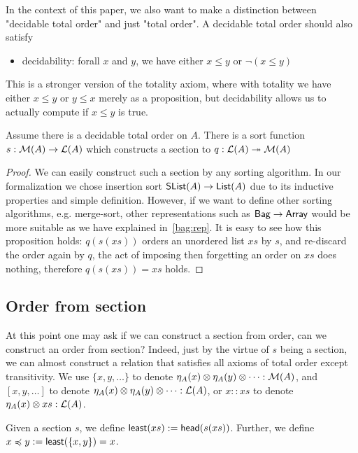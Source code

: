 In the context of this paper, we also want to make a distinction between "decidable total order"
and just "total order". A decidable total order should also satisfy
\begin{itemize}
    \item decidability: forall $x$ and $y$, we have either $x \leq y$ or $\neg(x \leq y)$ 
\end{itemize}

This is a stronger version of the totality axiom, where with totality we have 
either $x \leq y$ or $y \leq x$ merely as a proposition, but decidability allows us to actually
compute if $x \leq y$ is true.

\begin{proposition}
Assume there is a decidable total order on $A$. There is a sort function $s: \mathcal{M}(A) \to \mathcal{L}(A)$
which constructs a section to $q : \mathcal{L}(A) \twoheadrightarrow \mathcal{M}(A)$
\end{proposition}

\begin{proof}
We can easily construct such a section by any sorting algorithm. In our formalization we chose
insertion sort $\operatorname{\mathsf{SList}}(A) \to \operatorname{\mathsf{List}}(A)$ due to its inductive properties and simple definition.
However, if we want to define other sorting algorithms, e.g. merge-sort,
other representations such as $\operatorname{\mathsf{Bag}} \to \operatorname{\mathsf{Array}}$ would be more suitable as we have explained in~\ref{bag:rep}.
It is easy to see how this
proposition holds: $q(s(xs))$ orders an unordered list $xs$ by $s$, and re-discard the order again by
$q$, the act of imposing then forgetting an order on $xs$ does nothing, therefore $q(s(xs)) = xs$ holds.
\end{proof}


\subsection{Order from section}
At this point one may ask if we can construct a section from order, can we construct an order from section?
Indeed, just by the virtue of $s$ being a section, we can almost construct a relation that satisfies
all axioms of total order except transitivity.
We use $\{x,y,\dots\}$ to denote $\eta_A(x) \otimes \eta_A(y) \otimes \dots : \mathcal{M}(A)$,
and $[x, y, \dots]$ to denote $\eta_A(x) \otimes \eta_A(y) \otimes \dots : \mathcal{L}(A)$,
or $x :: xs$ to denote $\eta_A(x) \otimes xs : \mathcal{L}(A)$.

\begin{definition}
Given a section $s$, we define $\operatorname{\mathsf{least}}(xs) := \operatorname{\mathsf{head}}(s(xs))$.
Further, we define $x \preccurlyeq y := \operatorname{\mathsf{least}}(\{x, y\}) = x$. 
\end{definition}


